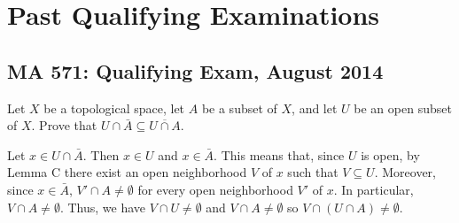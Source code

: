 \section{Past Qualifying Examinations}
\subsection{MA 571: Qualifying Exam, August 2014}
\setcounter{exercise}{0}
\begin{problem}
  Let $X$ be a topological space, let $A$ be a subset of $X$, and let $U$
  be an open subset of $X$. Prove that
  $U\cap \bar A\subseteq\overline{U\cap A}$.
\end{problem}
\begin{solution}
  Let $x\in U\cap\bar A$. Then $x\in U$ and $x\in\bar A$. This means that,
  since $U$ is open, by Lemma C there exist an open neighborhood $V$ of $x$
  such that $V\subseteq U$. Moreover, since $x\in\bar A$,
  $V'\cap A\neq\emptyset$ for every open neighborhood $V'$ of $x$. In
  particular, $V\cap A\neq\emptyset$. Thus, we have $V\cap U\neq\emptyset$
  and $V\cap A\neq\emptyset$ so $V\cap(U\cap A)\neq\emptyset$.
\end{solution}

